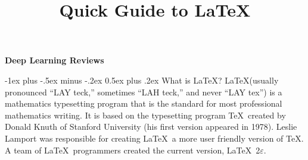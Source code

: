 \documentclass[10pt,landscape]{article}
\title{Quick Guide to LaTeX}
\makeatletter
\renewcommand{\section}{\@startsection{section}{1}{0mm}%
                                {-1ex plus -.5ex minus -.2ex}%
                                {0.5ex plus .2ex}%
                                {\normalfont\large\bfseries}}
\renewcommand{\subsection}{\@startsection{subsection}{2}{0mm}%
                                {-1explus -.5ex minus -.2ex}%
                                {0.5ex plus .2ex}%
                                {\normalfont\normalsize\bfseries}}
\makeatother
\begin{document}
\raggedright
\footnotesize

\begin{center}
     \Large{\textbf{Deep Learning Reviews}} \\
\end{center}
\begin{multicols}{3}
\setlength{\premulticols}{1pt}
\setlength{\postmulticols}{1pt}
\setlength{\multicolsep}{1pt}
\setlength{\columnsep}{2pt}

\section{What is \LaTeX?}
\LaTeX (usually pronounced ``LAY teck,'' sometimes ``LAH teck,'' and never ``LAY tex'') is a mathematics typesetting program that is the standard for most professional mathematics writing. It is based on the typesetting program \TeX\ created by Donald Knuth of Stanford University (his first version appeared in 1978). Leslie Lamport was responsible for creating \LaTeX\, a more user friendly version of \TeX. A team of \LaTeX\ programmers created the current version,  \LaTeX\ 2$\varepsilon$.
%
%
%
%

\end{multicols}
\end{document}
